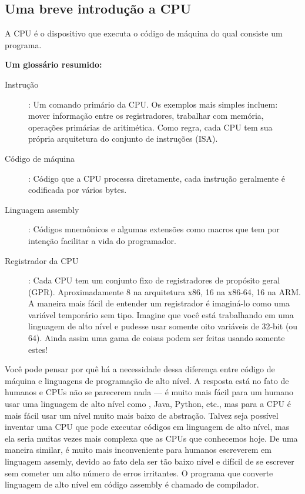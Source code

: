 \subsection{Uma breve introdução a CPU}

A \ac{CPU} é o dispositivo que executa o código de máquina do qual consiste um programa.

\textbf{Um glossário resumido:}

\begin{description}
\item[Instrução]: Um comando primário da \ac{CPU}. Os exemplos mais simples incluem: mover informação entre os registradores, trabalhar com memória, operações primárias de aritimética.
Como regra, cada \ac{CPU} tem sua própria arquitetura do conjunto de instruções (\ac{ISA}).

\item[Código de máquina]: Código que a \ac{CPU} processa diretamente, cada instrução geralmente é codificada por vários bytes.

\item[Linguagem assembly]: Códigos mnemônicos e algumas extensões como macros que tem por intenção facilitar a vida do programador.

\item[Registrador da CPU]: Cada \ac{CPU} tem um conjunto fixo de registradores de propósito geral (\ac{GPR}).
Aproximadamente 8 na arquitetura x86, 16 na x86-64, 16 na ARM.
A maneira mais fácil de entender um registrador é imaginá-lo como uma variável temporário sem tipo.
Imagine que você está trabalhando em uma linguagem de alto nível e pudesse usar somente oito variáveis de 32-bit (ou 64).
Ainda assim uma gama de coisas podem ser feitas usando somente estes!

\end{description}

Você pode pensar por quê há a necessidade dessa diferença entre código de máquina e linguagens de programação de alto nível.
A resposta está no fato de humanos e CPUs não se parecerem nada --- é muito mais fácil para um humano usar uma linguagem de alto nível como \CCpp, Java, Python, etc., 
mas para a CPU é mais fácil usar um nível muito mais baixo de abstração.
Talvez seja possível inventar uma CPU que pode executar códigos em linguagem de alto nível, mas ela seria muitas vezes mais complexa que as CPUs que conhecemos hoje.
De uma maneira similar, é muito mais inconveniente para humanos escreverem em linguagem assemly,
devido ao fato dela ser tão baixo nível e difícil de se escrever sem cometer um alto número de erros irritantes. O programa que converte linguagem de alto nível em código assembly é chamado de compilador.

